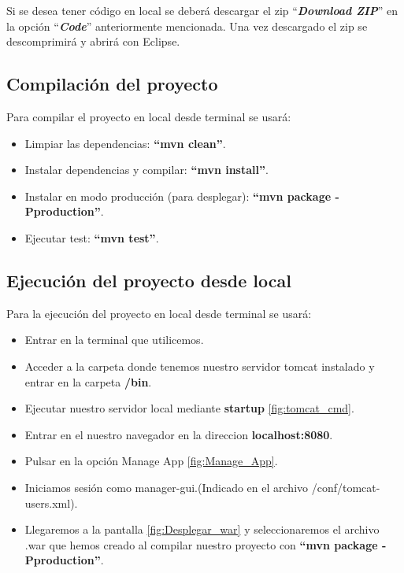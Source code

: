 
Si se desea tener código en local se deberá descargar el zip ``\textbf{\textit{Download ZIP}}'' en la opción ``\textbf{\textit{Code}}'' anteriormente mencionada. Una vez descargado el zip se descomprimirá y abrirá con Eclipse. 

\subsection{Compilación del proyecto}

Para compilar el proyecto en local desde terminal se usará:
\begin{itemize}
	\item Limpiar las dependencias: \textbf{``mvn clean''}.
	\item Instalar dependencias y compilar: \textbf{``mvn install''}.
	\item Instalar en modo producción (para desplegar): \textbf{``mvn package -Pproduction''}.  
	\item Ejecutar test: \textbf{``mvn test''}.	
\end{itemize}

\subsection{Ejecución del proyecto desde local}

Para la ejecución del proyecto en local desde terminal se usará:
\begin{itemize}
	\item Entrar en la terminal que utilicemos.
	\item Acceder a la carpeta donde tenemos nuestro servidor tomcat instalado y entrar en la carpeta \textbf{/bin}.
	\item Ejecutar nuestro servidor local mediante \textbf{startup} \ref{fig:tomcat_cmd}.  
	\item Entrar en el nuestro navegador en la direccion \textbf{localhost:8080}.
	\item Pulsar en la opción Manage App \ref{fig:Manage_App}.
	\item Iniciamos sesión como manager-gui.(Indicado en el archivo /conf/tomcat-users.xml).
	\item Llegaremos a la pantalla \ref{fig:Desplegar_war} y seleccionaremos el archivo .war que hemos creado al compilar nuestro proyecto con \textbf{``mvn package -Pproduction''}.
	
	
	
	
\end{itemize}

